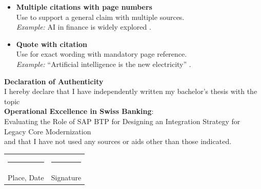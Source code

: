 \documentclass[12pt,a4paper]{article}
\newcommand{\myTitle}{Operational Excellence in Swiss Banking}
\newcommand{\mySubtitle}{Evaluating the Role of SAP BTP for Designing an Integration Strategy for Legacy Core Modernization }
\numberwithin{table}{section}
\numberwithin{figure}{section}
\renewcommand{\thetable}{\arabic{section}.\arabic{table}}
\renewcommand{\thefigure}{\arabic{section}.\arabic{figure}}
\begin{document}
\begin{itemize}
  \item \textbf{Multiple citations with page numbers} \\
  Use to support a general claim with multiple sources.\\
  \textit{Example:} AI in finance is widely explored 
  \parencites
    [pp.~15--17]{russell_artificial_2010}
    [p.~112]{feuerriegel_generative_2024}.

  \item \textbf{Quote with citation} \\
  Use for exact wording with mandatory page reference.\\
  \textit{Example:} ``Artificial intelligence is the new electricity'' \parencite[p.~7]{russell_artificial_2010}.
\end{itemize}
\clearpage

\clearpage
\renewcommand{\contentsname}{Table of Contents}
\tableofcontents
\clearpage





\printbibliography[heading=bibintoc, title={References}]
\newpage

\renewcommand{\thetable}{\Alph{section}.\arabic{table}}
\renewcommand{\thefigure}{\Alph{section}.\arabic{figure}}
\renewcommand{\thelstlisting}{\Alph{section}.\arabic{lstlisting}}

\thispagestyle{empty}
\begin{center}
	\vspace*{2cm}
	\Huge\textbf{Declaration of Authenticity}\\
	\vspace*{3cm}
	\normalsize
	I hereby declare that I have independently written my bachelor's thesis with the topic\\
	\vspace{2cm}
	\Large\textbf{\myTitle}: \\
	\mySubtitle\\
	\vspace{2cm}
	\normalsize
	and that I have not used any sources or aids other than those indicated.\\
	\vfill
	\begin{tabularx}{\textwidth}{l@{\extracolsep\fill}r}
	\rule{6cm}{0.1mm}&\rule{4cm}{0.1mm}\\
	Place, Date&Signature
	\end{tabularx}
\end{center}
\newpage
\end{document}
